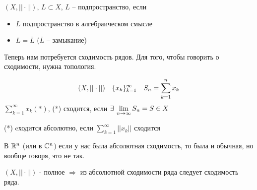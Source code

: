 \documentclass[document]{subfiles}
\begin{document}
\begin{definition}[подпространство]
    $(X, || \cdot ||)$, $L \subset X$, $L$ -- подпространство, если
    \begin{itemize}
        \item $L$ подпространство в алгебраическом смысле
        \item $L = \overline{L}$ ($\overline{L}$ -- замыкание)
    \end{itemize}
\end{definition}

Теперь нам потребуется сходимость рядов. Для того, чтобы говорить о сходимости, нужна топология.

\begin{definition}[Cходимость]
    \[(X, || \cdot ||) \quad \{x_k\}^\infty_{k=1} \quad S_n = \sum^n_{k=1} x_k \]
    $\sum_{k=1}^\infty x_k (*)$,  
    (*) сходится, если $\exists \liml_{n \to \infty}{S_n} = S \in X$

    (*) cходится абсолютно, если $\sum^\infty_{k=1} ||x_k||$ сходится
\end{definition}
В $\mathbb{R}^n$ (или в $\mathbb{C}^n$) если у нас была абсолютная сходимость, то была и обычная, но вообще говоря, это не так.

\begin{theorem}
    $(X, || \cdot||)$ - полное $\Rightarrow$ из абсолютной сходимости ряда следует сходимость ряда.
\end{theorem}
\end{document}
